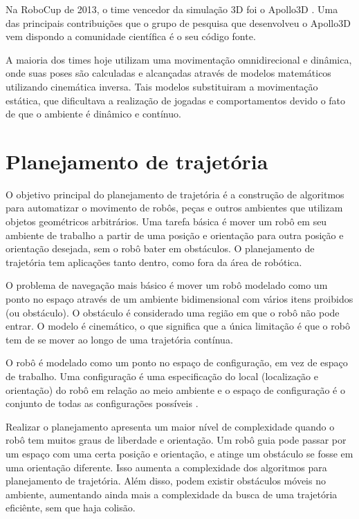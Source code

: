 Na RoboCup de 2013, o time vencedor da simulação 3D foi o Apollo3D \cite{apollo3d}. Uma das principais contribuições que o 
grupo de pesquisa que desenvolveu o Apollo3D vem dispondo a comunidade científica é o seu código fonte.

A maioria dos times hoje utilizam uma movimentação omnidirecional e dinâmica, onde suas poses são calculadas e alcançadas através de 
modelos matemáticos utilizando cinemática inversa. Tais modelos substituiram a movimentação estática, que dificultava a realização de 
jogadas e comportamentos devido o fato de que o ambiente é dinâmico e contínuo. 


\section{Planejamento de trajet\'oria}
\label{sec:planejamentodetrajetorias}
O objetivo principal do planejamento de trajetória é a construção de algoritmos para automatizar o movimento de robôs, 
peças e outros ambientes que utilizam objetos geométricos arbitrários. Uma tarefa básica é mover um robô em seu ambiente de trabalho 
a partir de uma posição e orientação para outra posição e orientação desejada, sem o robô bater em obstáculos. O planejamento de trajetória
tem aplicações tanto dentro, como fora da área de robótica.

O problema de navegação mais básico é mover um robô modelado como um ponto no espaço através de um ambiente bidimensional com vários
itens proibidos (ou obstáculo). O obstáculo é considerado uma região em que o robô não pode entrar. O modelo é cinemático, o que significa
que a única limitação é que o robô tem de se mover ao longo de uma trajetória contínua.

O robô é modelado como um ponto no espaço de configuração, em vez de espaço de trabalho. Uma configuração é uma especificação
do local (localização e orientação) do robô em relação ao meio ambiente e o espaço de configuração é o conjunto de todas as configurações
possíveis \cite{achoset}.

Realizar o planejamento apresenta um maior nível de complexidade quando o robô tem muitos graus de liberdade e orientação. Um robô 
guia pode passar por um espaço com uma certa posição e orientação, e atinge um obstáculo se fosse em uma orientação diferente. Isso 
aumenta a complexidade dos algoritmos para planejamento de trajetória. Além disso, podem existir obstáculos móveis no ambiente, 
aumentando ainda mais a complexidade da busca de uma trajetória eficiênte, sem que haja colisão.

